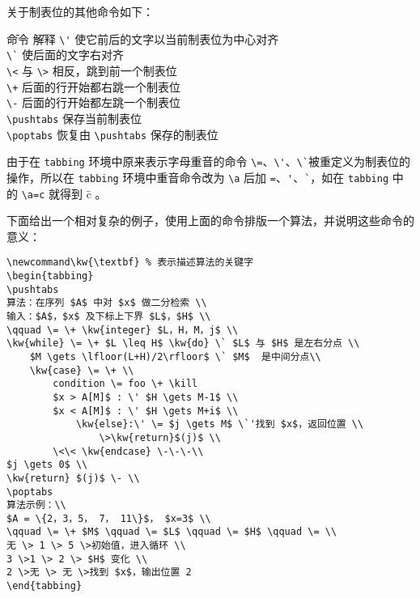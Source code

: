 关于制表位的其他命令如下：
\begin{tabbing}
    \hspace{12em} \= 命令\hspace{4em} \= 解释 \kill
    \> \lstinline{\'} \> 使它前后的文字以当前制表位为中心对齐 \\
    \> \lstinline{\`} \> 使后面的文字右对齐 \\
    \> \lstinline{\<}  \> 与 \lstinline{\>} 相反，跳到前一个制表位 \\
    \> \lstinline{\+} \> 后面的行开始都右跳一个制表位 \\ 
    \> \lstinline{\-} \> 后面的行开始都左跳一个制表位 \\
    \> \lstinline{\pushtabs} \> 保存当前制表位 \\
    \> \lstinline{\poptabs} \> 恢复由 \lstinline{\pushtabs} 保存的制表位 \\
\end{tabbing}

由于在 \verb|tabbing| 环境中原来表示字母重音的命令 \verb|\=|、\verb|\'|、\verb|\`|被重定义为制表位的操作，所以在 \verb|tabbing| 环境中重音命令改为 \verb|\a| 后加 \verb|=|、\verb|'|、\verb|`|，如在 \verb|tabbing| 中的 \verb|\a=c| 就得到 \=c 。

下面给出一个相对复杂的例子，使用上面的命令排版一个算法，并说明这些命令的意义：
\begin{lstlisting}
\newcommand\kw{\textbf} % 表示描述算法的关键字
\begin{tabbing}
\pushtabs
算法：在序列 $A$ 中对 $x$ 做二分检索 \\
输入：$A$，$x$ 及下标上下界 $L$，$H$ \\ 
\qquad \= \+ \kw{integer} $L，H，M，j$ \\ 
\kw{while} \= \+ $L \leq H$ \kw{do} \` $L$ 与 $H$ 是左右分点 \\
    $M \gets \lfloor(L+H)/2\rfloor$ \` $M$  是中间分点\\
    \kw{case} \= \+ \\
        condition \= foo \+ \kill
        $x > A[M]$ : \' $H \gets M-1$ \\ 
        $x < A[M]$ : \' $H \gets M+i$ \\
            \kw{else}:\' \= $j \gets M$ \`'找到 $x$，返回位置 \\
                \>\kw{return}$(j)$ \\
        \<\< \kw{endcase} \-\-\-\\
$j \gets 0$ \\
\kw{return} $(j)$ \- \\
\poptabs
算法示例：\\
$A = \{2，3，5， 7， 11\}$， $x=3$ \\
\qquad \= \+ $M$ \qquad \= $L$ \qquad \= $H$ \qquad \= \\
无 \> 1 \> 5 \>初始值，进入循环 \\
3 \>1 \> 2 \> $H$ 变化 \\
2 \>无 \> 无 \>找到 $x$，输出位置 2
\end{tabbing}
\end{lstlisting}

